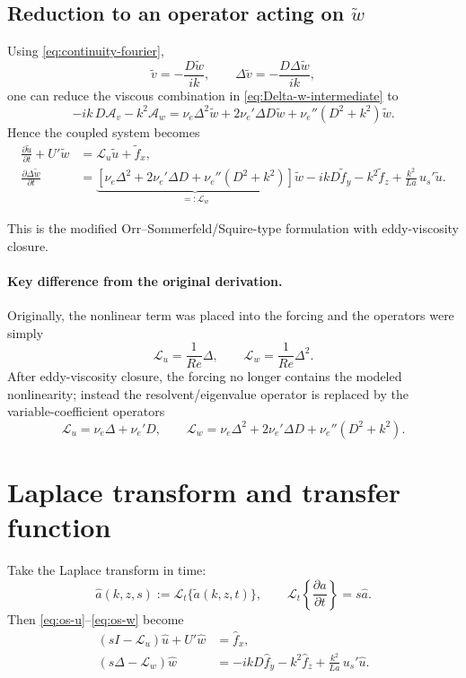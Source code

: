 \documentclass[11pt]{article}
\begin{document}
\subsection{Reduction to an operator acting on \(\tilde w\)}

Using \eqref{eq:continuity-fourier},
\[
\tilde v = -\frac{D\tilde w}{ik},
\qquad
\Delta \tilde v = -\frac{D\Delta \tilde w}{ik},
\]
one can reduce the viscous combination in \eqref{eq:Delta-w-intermediate} to
\begin{equation}
-ik\,D\mathcal A_v
-k^2 \mathcal A_w
=
\nu_e \Delta^2 \tilde w
+2\nu_e' \Delta D\tilde w
+\nu_e''(D^2+k^2)\tilde w.
\label{eq:variable-viscous-OS}
\end{equation}
Hence the coupled system becomes
\begin{subequations}
\begin{align}
\frac{\partial \tilde u}{\partial t} + U' \tilde w
&=
\mathcal L_u \tilde u + \tilde f_x,
\label{eq:os-u}
\\
\frac{\partial \Delta \tilde w}{\partial t}
&=
\underbrace{\left[
\nu_e \Delta^2
+2\nu_e' \Delta D
+\nu_e''(D^2+k^2)
\right]}_{=:\mathcal L_w}
\tilde w
-ikD\tilde f_y
-k^2\tilde f_z
+\frac{k^2}{La}\,u_s'\tilde u.
\label{eq:os-w}
\end{align}
\end{subequations}

This is the modified Orr--Sommerfeld/Squire-type formulation with eddy-viscosity closure.

\paragraph{Key difference from the original derivation.}
Originally, the nonlinear term was placed into the forcing and the operators were simply
\[
\mathcal L_u = \frac{1}{Re}\Delta,
\qquad
\mathcal L_w = \frac{1}{Re}\Delta^2.
\]
After eddy-viscosity closure, the forcing no longer contains the modeled nonlinearity; instead the resolvent/eigenvalue operator is replaced by the variable-coefficient operators
\[
\mathcal L_u = \nu_e \Delta + \nu_e' D,
\qquad
\mathcal L_w = \nu_e \Delta^2 + 2\nu_e' \Delta D + \nu_e''(D^2+k^2).
\]

\section{Laplace transform and transfer function}

Take the Laplace transform in time:
\[
\hat a(k,z,s) := \mathcal L_t\{\tilde a(k,z,t)\},
\qquad
\mathcal L_t\left\{\frac{\partial a}{\partial t}\right\}=s\hat a.
\]
Then \eqref{eq:os-u}--\eqref{eq:os-w} become
\begin{subequations}
\begin{align}
\left(sI-\mathcal L_u\right)\hat u + U'\hat w
&=
\hat f_x,
\label{eq:laplace-u}
\\
\left(s\Delta-\mathcal L_w\right)\hat w
&=
-ikD\hat f_y
-k^2\hat f_z
+\frac{k^2}{La}\,u_s' \hat u.
\label{eq:laplace-w}
\end{align}
\end{subequations}
\end{document}
